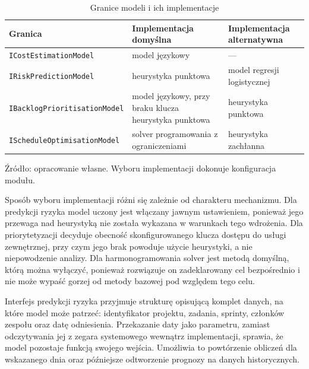 \begin{table}[htbp]
    \centering
    \small
    \caption{Granice modeli i ich implementacje}
    \label{tab:granice-modeli}
    \begin{tabularx}{\textwidth}{@{}lXX@{}}
        \toprule
        \textbf{Granica} & \textbf{Implementacja domyślna} & \textbf{Implementacja alternatywna} \\
        \midrule
        \texttt{ICostEstimationModel}
        & model językowy
        & --- \\
        \addlinespace
        \texttt{IRiskPredictionModel}
        & heurystyka punktowa
        & model regresji logistycznej \\
        \addlinespace
        \texttt{IBacklogPrioritisationModel}
        & model językowy, przy braku klucza heurystyka punktowa
        & heurystyka punktowa \\
        \addlinespace
        \texttt{IScheduleOptimisationModel}
        & solver programowania z ograniczeniami
        & heurystyka zachłanna \\
        \bottomrule
    \end{tabularx}

    \par\smallskip
    \begin{minipage}{\textwidth}
        \footnotesize
        Źródło: opracowanie własne. Wyboru implementacji dokonuje konfiguracja modułu.
    \end{minipage}
\end{table}

Sposób wyboru implementacji różni się zależnie od charakteru mechanizmu. Dla predykcji ryzyka model uczony jest włączany jawnym ustawieniem, ponieważ jego przewaga nad heurystyką nie została wykazana w warunkach tego wdrożenia. Dla priorytetyzacji decyduje obecność skonfigurowanego klucza dostępu do usługi zewnętrznej, przy czym jego brak powoduje użycie heurystyki, a nie niepowodzenie analizy. Dla harmonogramowania solver jest metodą domyślną, którą można wyłączyć, ponieważ rozwiązuje on zadeklarowany cel bezpośrednio i nie może wypaść gorzej od metody bazowej pod względem tego celu.

Interfejs predykcji ryzyka przyjmuje strukturę opisującą komplet danych, na które model może patrzeć: identyfikator projektu, zadania, sprinty, członków zespołu oraz datę odniesienia. Przekazanie daty jako parametru, zamiast odczytywania jej z zegara systemowego wewnątrz implementacji, sprawia, że model pozostaje funkcją swojego wejścia. Umożliwia to powtórzenie obliczeń dla wskazanego dnia oraz późniejsze odtworzenie prognozy na danych historycznych.

